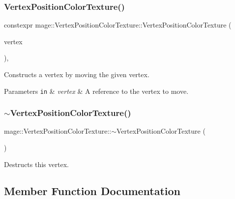 \subsubsection{\texorpdfstring{Vertex\+Position\+Color\+Texture()}{VertexPositionColorTexture()}\hspace{0.1cm}{\footnotesize\ttfamily [4/4]}}
{\footnotesize\ttfamily constexpr mage\+::\+Vertex\+Position\+Color\+Texture\+::\+Vertex\+Position\+Color\+Texture (\begin{DoxyParamCaption}\item[{\hyperlink{structmage_1_1_vertex_position_color_texture}{Vertex\+Position\+Color\+Texture} \&\&}]{vertex }\end{DoxyParamCaption})\hspace{0.3cm}{\ttfamily [default]}, {\ttfamily [noexcept]}}

Constructs a vertex by moving the given vertex.


\begin{DoxyParams}[1]{Parameters}
\mbox{\tt in}  & {\em vertex} & A reference to the vertex to move. \\
\hline
\end{DoxyParams}
\hypertarget{structmage_1_1_vertex_position_color_texture_a07cc697a88ef1a75ef64aadac9945c11}{}\label{structmage_1_1_vertex_position_color_texture_a07cc697a88ef1a75ef64aadac9945c11} 
\subsubsection{\texorpdfstring{$\sim$\+Vertex\+Position\+Color\+Texture()}{~VertexPositionColorTexture()}}
{\footnotesize\ttfamily mage\+::\+Vertex\+Position\+Color\+Texture\+::$\sim$\+Vertex\+Position\+Color\+Texture (\begin{DoxyParamCaption}{ }\end{DoxyParamCaption})\hspace{0.3cm}{\ttfamily [default]}}

Destructs this vertex. 

\subsection{Member Function Documentation}
\hypertarget{structmage_1_1_vertex_position_color_texture_a3eeee863375fee721cbb8e516a582a1e}{}\label{structmage_1_1_vertex_position_color_texture_a3eeee863375fee721cbb8e516a582a1e} 
